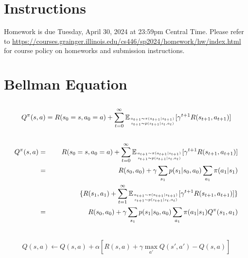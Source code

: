 \documentclass[12pt]{article}
\begin{document}
\singlespacing

\renewcommand{\familydefault}{\rmdefault}


\section{Instructions}

Homework is due Tuesday, April 30, 2024 at 23:59pm Central Time.
Please refer to \url{https://courses.grainger.illinois.edu/cs446/sp2024/homework/hw/index.html} for course policy on homeworks and submission instructions.

\section{Bellman Equation}
\subsection{}
\begin{eqnarray}
    Q^{\pi}(s, a) = R(s_0=s, a_0=a) + \sum_{t=0}^{\infty } \mathbb{E} _{a_{t+1} \sim  \pi (a_{t+1}|s_{t+1})
                                            \atop
                                           s_{t+1} \sim p(s_{t+1}|s_t , a_t) } [\gamma^{t+1} R(s_{t+1} , a_{t+1})] \nonumber
\end{eqnarray}

\subsection{}
\begin{eqnarray}
    Q^{\pi}(s, a) &=& R(s_0=s, a_0=a) + \sum_{t=0}^{\infty } \mathbb{E} _{a_{t+1} \sim  \pi (a_{t+1}|s_{t+1})
                                            \atop
                                           s_{t+1} \sim p(s_{t+1}|s_t , a_t) } [\gamma^{t+1} R(s_{t+1} , a_{t+1})] \nonumber \\
    &=& R(s_0, a_0) + \gamma \sum_{s_1} p(s_1 | s_0, a_0) \sum_{a_1} \pi(a_1 | s_1) \nonumber  \\
    && \quad  \quad \quad \quad\{R(s_1, a_1) +\sum_{t=1}^{\infty } \mathbb{E} _{a_{t+1} \sim  \pi (a_{t+1}|s_{t+1}) \atop s_{t+1} \sim p(s_{t+1}|s_t , a_t) } [\gamma^{t+1} R(s_{t+1} , a_{t+1})]\} \nonumber \\
    &=& R(s_0, a_0) + \gamma \sum_{s_1} p(s_1 | s_0, a_0) \sum_{a_1} \pi(a_1 | s_1) Q^{\pi}(s_1, a_1) \nonumber
\end{eqnarray}

\subsection{}
\begin{eqnarray}
    Q(s , a) \leftarrow Q(s , a) + \alpha \left[ R(s, a) + \gamma \max_{a'} Q(s' , a') - Q(s , a) \right] \nonumber
\end{eqnarray}
\end{document}
